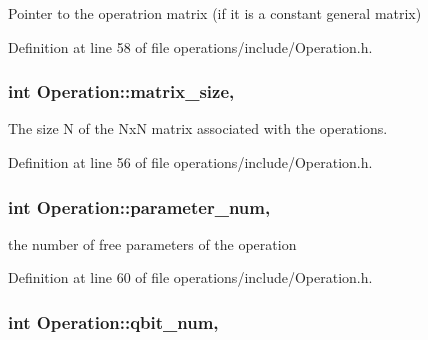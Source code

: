 Pointer to the operatrion matrix (if it is a constant general matrix) 



Definition at line 58 of file operations/include/\+Operation.\+h.

\subsubsection[{\texorpdfstring{matrix\+\_\+size}{matrix_size}}]{\setlength{\rightskip}{0pt plus 5cm}int Operation\+::matrix\+\_\+size\hspace{0.3cm}{\ttfamily [protected]}, {\ttfamily [inherited]}}\hypertarget{class_operation_a8236c07112cb165a00d3869363808624}{}\label{class_operation_a8236c07112cb165a00d3869363808624}


The size N of the NxN matrix associated with the operations. 



Definition at line 56 of file operations/include/\+Operation.\+h.

\subsubsection[{\texorpdfstring{parameter\+\_\+num}{parameter_num}}]{\setlength{\rightskip}{0pt plus 5cm}int Operation\+::parameter\+\_\+num\hspace{0.3cm}{\ttfamily [protected]}, {\ttfamily [inherited]}}\hypertarget{class_operation_aa57505afe5b5ec27f6d053044b86e043}{}\label{class_operation_aa57505afe5b5ec27f6d053044b86e043}


the number of free parameters of the operation 



Definition at line 60 of file operations/include/\+Operation.\+h.

\subsubsection[{\texorpdfstring{qbit\+\_\+num}{qbit_num}}]{\setlength{\rightskip}{0pt plus 5cm}int Operation\+::qbit\+\_\+num\hspace{0.3cm}{\ttfamily [protected]}, {\ttfamily [inherited]}}\hypertarget{class_operation_aecd5fbf1dd4ea532b2e58471ff8bad69}{}\label{class_operation_aecd5fbf1dd4ea532b2e58471ff8bad69}


